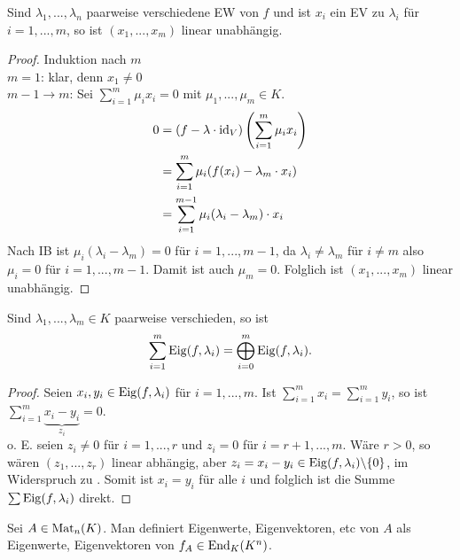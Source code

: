 \begin{lemma}
	Sind $\lambda_1,...,\lambda_n$ paarweise verschiedene EW von $f$ und ist $x_i$ ein EV zu $\lambda_i$ für $i=1,...,m$, so ist $(x_1,...,x_m)$ linear unabhängig.
\end{lemma}
\begin{proof}
	Induktion nach $m$\\
	\emph{$m=1$}: klar, denn $x_1\neq 0$ \\
	\emph{$m-1\to m$}: Sei $\sum_{i=1}^m \mu_i x_i=0$ mit $\mu_1,...,\mu_m\in K$.
	\begin{align}
		0&= (f-\lambda\cdot\operatorname{id}_V)\left( \sum\limits_{i=1}^m \mu_i x_i\right) \notag \\
		&= \sum\limits_{i=1}^m \mu_i(f(x_i)-\lambda_m\cdot x_i) \notag \\
		&= \sum\limits_{i=1}^{m-1} \mu_i(\lambda_i-\lambda_m)\cdot x_i \notag
	\end{align} 
	Nach IB ist $\mu_i(\lambda_i-\lambda_m)=0$ für $i=1,...,m-1$, da $\lambda_i\neq\lambda_m$ für $i\neq m$ also $\mu_i=0$ für $i=1,...,m-1$. Damit ist auch $\mu_m=0$. Folglich ist $(x_1,...,x_m)$ linear unabhängig.
\end{proof}

\begin{proposition}
	Sind $\lambda_1,...,\lambda_m\in K$ paarweise verschieden, so ist 
	\[\sum\limits_{i=1}^m \operatorname{Eig}(f,\lambda_i)=\bigoplus_{i=0}^{m}\operatorname{Eig}(f,\lambda_i).\]
\end{proposition}
\begin{proof}
	Seien $x_i,y_i\in\operatorname{Eig}(f,\lambda_i)$ für $i=1,...,m$. Ist $\sum_{i=1}^m x_i=\sum_{i=1}^m y_i$, so ist $\sum_{i=1}^m \underbrace{x_i-y_i}_{z_i}=0$.\\
	o. E. seien $z_i\neq 0$ für $i=1,...,r$ und $z_i=0$ für $i=r+1,...,m$. Wäre $r>0$, so wären $(z_1,...,z_r)$ linear abhängig, aber $z_i=x_i-y_i\in\operatorname{Eig}(f,\lambda_i)\backslash\{0\}$, im Widerspruch zu . Somit ist $x_i=y_i$ für alle $i$ und folglich ist die Summe $\sum\operatorname{Eig}(f,\lambda_i)$ direkt.
\end{proof}

\begin{definition}
	Sei $A\in\operatorname{Mat}_n(K)$. Man definiert Eigenwerte, Eigenvektoren, etc von $A$ als Eigenwerte, Eigenvektoren von $f_A\in\operatorname{End}_K(K^n)$.
\end{definition}

